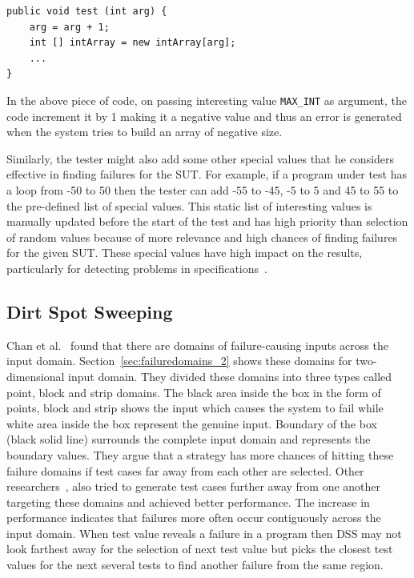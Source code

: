 \begin{lstlisting}
public void test (int arg) {
	arg = arg + 1;
	int [] intArray = new intArray[arg];
	...
}
\end{lstlisting}

In the above piece of code, on passing interesting value \verb+MAX_INT+ as argument, the code increment it by 1 making it a negative value and thus an error is generated when the system tries to build an array of negative size. 

Similarly, the tester might also add some other special values that he considers effective in finding failures for the SUT. For example, if a program under test has a loop from -50 to 50 then the tester can add -55 to -45, -5 to 5 and 45 to 55 to the pre-defined list of special values. This static list of interesting values is manually updated before the start of the test and has high priority than selection of random values because of more relevance and high chances of finding failures for the given SUT. These special values have high impact on the results, particularly for detecting problems in specifications~\cite{ciupa2008finding}.


\subsection{Dirt Spot Sweeping}
Chan et al.~\cite{chan1996proportional} found that there are domains of failure-causing inputs across the input domain. Section~\ref{sec:failuredomains_2} shows these domains for two-dimensional input domain. They divided these domains into three types called point, block and strip domains. The black area inside the box in the form of points, block and strip shows the input which causes the system to fail while white area inside the box represent the genuine input. Boundary of the box (black solid line) surrounds the complete input domain and represents the boundary values. They argue that a strategy has more chances of hitting these failure domains if test cases far away from each other are selected. Other researchers~\cite{chen2004mirror, chan2003normalized, chen2007quasi}, also tried to generate test cases further away from one another targeting these domains and achieved better performance. The increase in performance indicates that failures more often occur contiguously across the input domain. When test value reveals a failure in a program then DSS may not look farthest away for the selection of next test value but picks the closest test values for the next several tests to find another failure from the same region.

